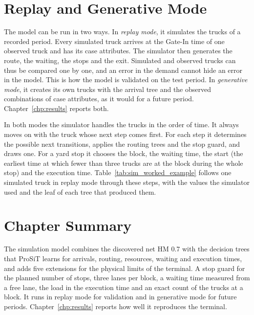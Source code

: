 \section{Replay and Generative Mode}
\label{sec:sim_modes}
\label{sec:sim_execution}

The model can be run in two ways. In \emph{replay mode}, it simulates the trucks of
a recorded period. Every simulated truck arrives at the Gate-In time of one observed
truck and has its case attributes. The simulator then generates the route, the
waiting, the stops and the exit. Simulated and observed trucks can
thus be compared one by one, and an error in the demand cannot hide an error in the
model. This is how the model is validated on the test period. In \emph{generative
mode}, it creates its own trucks with the arrival tree and the observed combinations
of case attributes, as it would for a future period. Chapter~\ref{chp:results}
reports both.

In both modes the simulator handles the trucks in the order of time. It always
moves on with the truck whose next step comes first. For each step it determines
the possible next transitions, applies the routing trees and the stop guard, and
draws one. For a yard stop it chooses the block, the waiting time, the start (the
earliest time at which fewer than three trucks are at the block during the whole
stop) and the execution time. Table~\ref{tab:sim_worked_example} follows one
simulated truck in replay mode through these steps, with the values the simulator
used and the leaf of each tree that produced them.


\FloatBarrier

\section{Chapter Summary}
\label{sec:sim_summary}

The simulation model combines the discovered net HM 0.7 with the decision trees
that ProSiT learns for arrivals, routing, resources, waiting and execution times,
and adds five extensions for the physical limits of the terminal. A stop guard for
the planned number of stops, three lanes per block, a waiting time measured from a
free lane, the load in the execution time and an exact count of the trucks at a
block. It runs in replay mode for validation and in generative mode for future
periods. Chapter~\ref{chp:results} reports how well it reproduces the terminal.

